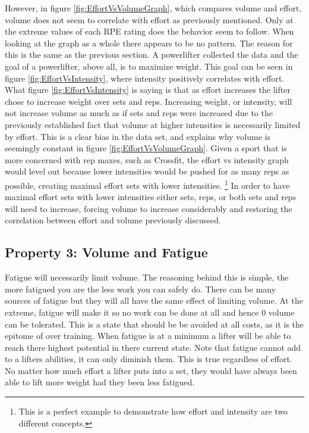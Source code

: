 However, in figure \ref{fig:EffortVsVolumeGraph}, which compares volume and effort, volume does not seem to correlate with effort as previously mentioned. Only at the extreme values of each RPE rating does the behavior seem to follow. When looking at the graph as a whole there appears to be no pattern. The reason for this is the same as the previous section. A powerlifter collected the data and the goal of a powerlifter, above all, is to maximize weight. This goal can be seen in figure \ref{fig:EffortVsIntensity}, where intensity positively correlates with effort. What figure \ref{fig:EffortVsIntensity} is saying is that as effort increases the lifter chose to increase weight over sets and reps. Increasing weight, or intensity, will not increase volume as much as if sets and reps were increased due to the previously established fact that volume at higher intensities is necessarily limited by effort. This is a clear bias in the data set, and explains why volume is seemingly constant in figure \ref{fig:EffortVsVolumeGraph}. Given a sport that is more concerned with rep maxes, such as Crossfit, the effort vs intensity graph would level out because lower intensities would be pushed for as many reps as possible, creating maximal effort sets with lower intensities. \footnote{This is a perfect example to demonstrate how effort and intensity are two different concepts.} In order to have maximal effort sets with lower intensities either sets, reps, or both sets and reps will need to increase, forcing volume to increase considerably and restoring the correlation between effort and volume previously discussed.


\subsection{Property 3: Volume and Fatigue}
\label{sec:PotentialSurfaceIntuitiveRelationshipsBetweenVariablesVolumeAndFatigue}

Fatigue will necessarily limit volume. The reasoning behind this is simple, the more fatigued you are the less work you can safely do. There can be many sources of fatigue but they will all have the same effect of limiting volume. At the extreme, fatigue will make it so no work can be done at all and hence $0$ volume can be tolerated. This is a state that should be be avoided at all costs, as it is the epitome of over training. When fatigue is at a minimum a lifter will be able to reach there highest potential in there current state. Note that fatigue cannot add to a lifters abilities, it can only diminish them. This is true regardless of effort. No matter how much effort a lifter puts into a set, they would have always been able to lift more weight had they been less fatigued.


